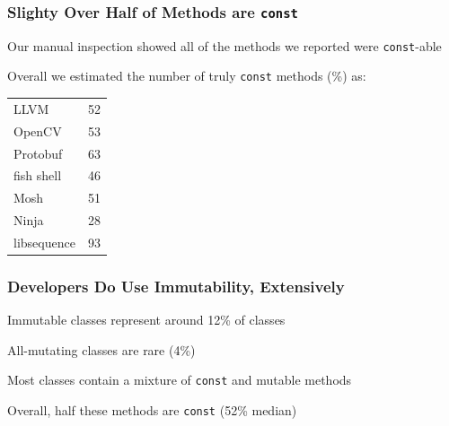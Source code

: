 \documentclass[aspectratio=169]{beamer}
\newcommand{\const}{\texttt{\bfseries const}}
\begin{document}
\begin{frame}
  \end{frame}

  \begin{frame}
    \frametitle{Slighty Over Half of Methods are \texttt{const}}

    Our manual inspection showed all of the methods we reported were
    \texttt{const}-able

    \vspace{2em}

    Overall we estimated the number of truly \texttt{const} methods (\%) as:

    \vspace{1em}
    
    \begin{center}\begin{tabular}{l r}
      LLVM         & 52\\
      OpenCV       & 53\\
      Protobuf     & 63 \\
      fish shell   & 46 \\
      Mosh         & 51 \\
      Ninja        & 28 \\
      libsequence  & 93 \\
    \end{tabular}\end{center}
  \end{frame}

  \begin{frame}
    \frametitle{Developers Do Use Immutability, Extensively}

    Immutable classes represent around 12\% of classes

    \hspace{1em} All-mutating classes are rare (4\%)

    \vspace{2em}

    Most classes contain a mixture of \texttt{const} and mutable methods

    \hspace{1em} Overall, half these methods are \texttt{const} (52\% median)
  \end{frame}
\end{document}
